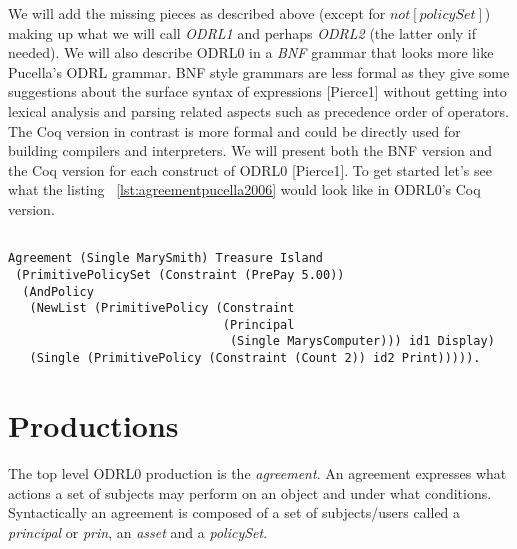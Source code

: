 We will add the missing pieces as described above (except for $not[policySet]$) making up what we will call \emph{ODRL1} and perhaps \emph{ODRL2} (the latter only if needed). We will also describe ODRL0 in a \emph{BNF} grammar that looks more like Pucella's ODRL grammar. BNF style grammars are less formal as they give some suggestions about the surface syntax of expressions [Pierce1] without getting into lexical analysis and parsing related aspects such as precedence order of operators. The Coq version in contrast is more formal and could be directly used for building compilers and interpreters. We will present both the BNF version and the Coq version for each construct of ODRL0 [Pierce1]. To get started let's see what the listing ~\ref{lst:agreementpucella2006} would look like in ODRL0's Coq version.

\lstset{language=Coq}
\begin{lstlisting}[frame=single, caption={Coq version of agreement for Mary Smith},label={lst:marysmithagreementcoq}]

Agreement (Single MarySmith) Treasure Island 
 (PrimitivePolicySet (Constraint (PrePay 5.00))
  (AndPolicy 
   (NewList (PrimitivePolicy (Constraint 
                              (Principal 
                               (Single MarysComputer))) id1 Display)
   (Single (PrimitivePolicy (Constraint (Count 2)) id2 Print))))).
\end{lstlisting}



\section{Productions} \label{sec:productionast}

The top level ODRL0 production is the \emph{agreement}. An agreement expresses what actions a set of subjects may perform on an object and under what conditions. Syntactically an agreement is composed of a set of subjects/users called a \emph{principal} or \emph{prin}, an \emph{asset} and a \emph{policySet}.

